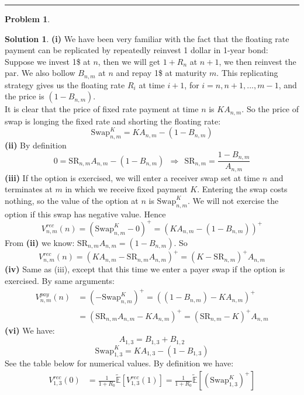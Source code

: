 \documentclass[a4paper, 10pt]{article}
\theoremstyle{definition}
\newtheorem{problem}{Problem}
\theoremstyle{hSol}
\newtheorem*{solution}{Solution}
\begin{document}
\noindent\rule{16cm}{0.4pt}
\begin{problem} 
\end{problem}
\begin{solution} \textbf{(i)} We have been very familiar with the fact that the floating rate payment can be replicated by repeatedly reinvest 1 dollar in 1-year bond: Suppose we invest 1\$ at $n$, then we will get $1+R_{n}$ at $n+1$, we then reinvest the par. We also bollow $B_{n,m}$ at $n$ and repay 1\$ at maturity $m$. This replicating strategy gives us the floating rate $R_{i}$ at time $i+1$, for $i=n, n+1, ..., m-1$, and the price is $(1-B_{n,m})$. \\
It is clear that the price of fixed rate payment at time $n$ is $KA_{n,m}$. So the price of swap is longing the fixed rate and shorting the floating rate:
$$
\text{Swap}_{n,m}^K = KA_{n,m} - (1-B_{n,m})
$$
\textbf{(ii)} By definition
\begin{equation}
  0 = \text{SR}_{n,m}A_{n,m} - (1-B_{n,m})~~\Rightarrow~~\text{SR}_{n,m}=\frac{1-B_{n,m}}{A_{n,m}}
\end{equation}
\textbf{(iii)} If the option is exercised, we will enter a receiver swap set at time $n$ and terminates at $m$ in which we receive fixed payment $K$. Entering the swap costs nothing, so the value of the option at $n$ is $\text{Swap}_{n,m}^K$. We will not exercise the option if this swap has negative value. Hence
$$
V_{n,m}^{rec}(n) = (\text{Swap}_{n,m}^K - 0)^+ = (KA_{n,m} - (1-B_{n,m}))^+
$$
From \textbf{(ii)} we know: $\text{SR}_{n,m}A_{n,m}=(1-B_{n,m})$. So
$$
V_{n,m}^{rec}(n) = (KA_{n,m} - \text{SR}_{n,m}A_{n,m})^+ = (K - \text{SR}_{n,m})^+A_{n,m}
$$
\textbf{(iv)} Same as (iii), except that this time we enter a payer swap if the option is exercised. By same arguments:
\begin{equation}
  \begin{split}
    V_{n,m}^{pay}(n) &= (-\text{Swap}_{n,m}^K )^+ = ((1-B_{n,m})-KA_{n,m})^+ \\
    &= (\text{SR}_{n,m}A_{n,m}-KA_{n,m})^+ = (\text{SR}_{n,m}-K)^+A_{n,m}
  \end{split}
\end{equation}
\textbf{(vi)} We have:
$$
A_{1,3} = B_{1,3}+B_{1,2}
$$
$$
\text{Swap}_{1,3}^K = KA_{1,3} - (1-B_{1,3})
$$
See the table below for numerical values. By definition we have:
\begin{equation}
  \begin{split}
      V_{1,3}^{rec}(0) &= \frac{1}{1+R_0} \tilde{\mathbb{E}}\left[V_{1,3}^{rec}(1)\right] = \frac{1}{1+R_0} \tilde{\mathbb{E}}\left[(\text{Swap}_{1,3}^K)^+\right]\\

\end{split}
\end{equation}
\end{solution}
\end{document}
